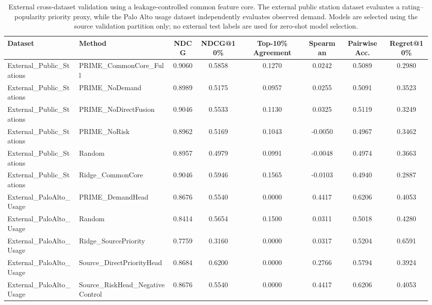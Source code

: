 
\begin{table}[!t]
\centering
\caption{External cross-dataset validation using a leakage-controlled common feature core. The external public station dataset evaluates a rating--popularity priority proxy, while the Palo Alto usage dataset independently evaluates observed demand. Models are selected using the source validation partition only; no external test labels are used for zero-shot model selection.}
\label{tab:cross_dataset_v10}
\scriptsize
\begin{tabular}{llcccccc}
\toprule
Dataset & Method & NDCG & NDCG@10\% & Top-10\% Agreement & Spearman & Pairwise Acc. & Regret@10\%\\
\midrule
External\_Public\_Stations & PRIME\_CommonCore\_Full & 0.9060 & 0.5858 & 0.1270 & 0.0242 & 0.5089 & 0.2980\\
External\_Public\_Stations & PRIME\_NoDemand & 0.8989 & 0.5175 & 0.0957 & 0.0255 & 0.5091 & 0.3523\\
External\_Public\_Stations & PRIME\_NoDirectFusion & 0.9046 & 0.5533 & 0.1130 & 0.0325 & 0.5119 & 0.3249\\
External\_Public\_Stations & PRIME\_NoRisk & 0.8962 & 0.5169 & 0.1043 & -0.0050 & 0.4967 & 0.3462\\
External\_Public\_Stations & Random & 0.8957 & 0.4979 & 0.0991 & -0.0048 & 0.4974 & 0.3663\\
External\_Public\_Stations & Ridge\_CommonCore & 0.9046 & 0.5946 & 0.1565 & -0.0103 & 0.4940 & 0.2887\\
External\_PaloAlto\_Usage & PRIME\_DemandHead & 0.8676 & 0.5540 & 0.0000 & 0.4417 & 0.6206 & 0.4053\\
External\_PaloAlto\_Usage & Random & 0.8414 & 0.5654 & 0.1500 & 0.0311 & 0.5018 & 0.4280\\
External\_PaloAlto\_Usage & Ridge\_SourcePriority & 0.7759 & 0.3160 & 0.0000 & 0.0317 & 0.5204 & 0.6591\\
External\_PaloAlto\_Usage & Source\_DirectPriorityHead & 0.8684 & 0.6200 & 0.0000 & 0.2766 & 0.5794 & 0.3924\\
External\_PaloAlto\_Usage & Source\_RiskHead\_NegativeControl & 0.8676 & 0.5540 & 0.0000 & 0.4417 & 0.6206 & 0.4053\\
\bottomrule
\end{tabular}
\end{table}

